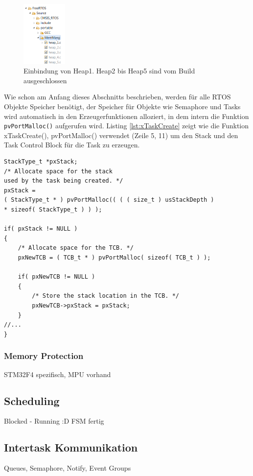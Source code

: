 \documentclass[ngerman]{seminarvorlage}
\begin{document}
\begin{figure}
	\centering
		\includegraphics[width=0.2\textwidth]{Pictures/Eclipse/Heaps.png}
	\caption{Einbindung von Heap1. Heap2 bis Heap5 sind vom Build ausgeschlossen}
	\label{fig:HeapsEclipse}
\end{figure}   
Wie schon am Anfang dieses Abschnitts beschrieben, werden für alle RTOS Objekte Speicher benötigt, der Speicher für Objekte wie Semaphore und Tasks wird automatisch in den Erzeugerfunktionen alloziert, in dem intern die Funktion \verb|pvPortMalloc()| aufgerufen wird. Listing \ref{lst:xTaskCreate} zeigt wie die Funktion xTaskCreate(), pvPortMalloc() verwendet (Zeile 5, 11) um den Stack und den Task Control Block für die Task zu erzeugen.   
\begin{lstlisting}[caption={xTaskCreate() memory allocation},captionpos=b, label=lst:xTaskCreate]
StackType_t *pxStack;
/* Allocate space for the stack 
used by the task being created. */
pxStack = 
( StackType_t * ) pvPortMalloc(( ( ( size_t ) usStackDepth ) 
* sizeof( StackType_t ) ) );

if( pxStack != NULL )
{
	/* Allocate space for the TCB. */
	pxNewTCB = ( TCB_t * ) pvPortMalloc( sizeof( TCB_t ) );

	if( pxNewTCB != NULL )
	{
		/* Store the stack location in the TCB. */
		pxNewTCB->pxStack = pxStack;
	}
//...
}
\end{lstlisting}
 


\subsubsection{Memory Protection}
STM32F4 spezifisch, MPU vorhand
\subsection{Scheduling}
Blocked - Running :D FSM fertig
\subsection{Intertask Kommunikation}
Queues, Semaphore, Notify, Event Groups
\end{document}
